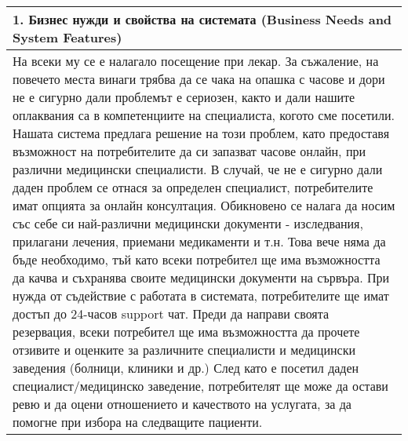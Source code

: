 \documentclass[a4paper,12pt]{article}
\begin{document}
\begin{xltabular}{\textwidth}{|X|}
\hline
{}1. Бизнес нужди и свойства на системата (Business Needs and System Features)\\
\hline
\parbox[t]{16.5cm}{
  На всеки му се е налагало посещение при лекар. За съжаление, на повечето места винаги трябва да се чака на опашка с часове и дори не е сигурно дали проблемът е сериозен, както и дали нашите оплаквания са в компетенциите на специалиста, когото сме посетили. Нашата система предлага решение на този проблем, като предоставя възможност на потребителите да си запазват часове онлайн, при различни медицински специалисти. В случай, че не е сигурно дали даден проблем се отнася за определен специалист, потребителите имат опцията за онлайн консултация. Обикновено се налага да носим със себе си най-различни медицински документи - изследвания, прилагани лечения, приемани медикаменти и т.н. Това вече няма да бъде необходимо, тъй като всеки потребител ще има възможността да качва и съхранява своите медицински документи на сървъра. При нужда от съдействие с работата в системата, потребителите ще имат достъп до 24-часов support чат.  Преди да направи своята резервация, всеки потребител ще има възможността да прочете отзивите и оценките за различните специалисти и медицински заведения (болници, клиники и др.) След като е посетил даден специалист/медицинско заведение, потребителят ще може да остави ревю и да оцени отношението и качеството на услугата, за да помогне при избора на следващите пациенти.\\
  
}
\end{xltabular}
\end{document}
